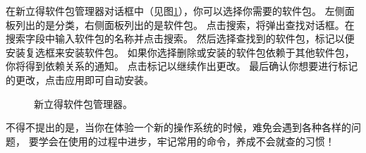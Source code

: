 在新立得软件包管理器对话框中（见图\ref{fig:Synaptic}），你可以选择你需要的软件包。
左侧面板列出的是分类，右侧面板列出的是软件包。
点击搜索，将弹出查找对话框。在搜索字段中输入软件包的名称并点击搜索。
然后选择查找到的软件包，标记以便安装复选框来安装软件包。
如果你选择删除或安装的软件包依赖于其他软件包，你将得到依赖关系的通知。
点击标记以继续作出更改。
最后确认你想要进行标记的更改，点击应用即可自动安装。
\begin{figure}[htbp]
	\centering
	\hfill
        \caption{新立得软件包管理器。}
	\label{fig:Synaptic}
\end{figure}

\begin{remark}
	不得不提出的是，当你在体验一个新的操作系统的时候，难免会遇到各种各样的问题，
	要学会在使用的过程中进步，牢记常用的命令，养成不会就查的习惯！
\end{remark}




